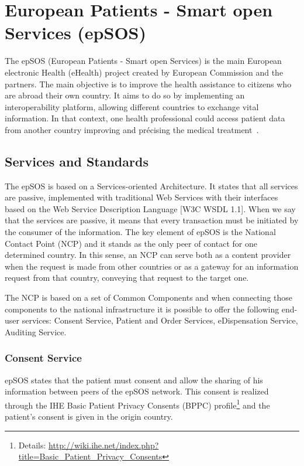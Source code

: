 \section{European Patients - Smart open Services (epSOS)} \label{sec:epsos}

The epSOS (European Patients - Smart open Services) is the main European electronic Health (eHealth) project created by European Commission and the partners. The main objective is to improve the health assistance to citizens who are abroad their own country. It aims to do so by implementing an interoperability platform, allowing different countries to exchange vital information. In that context, one health professional could access patient data from another country improving and précising the medical treatment~\citep{EpSOS}.

\subsection{Services and Standards}

The epSOS is based on a Services-oriented Architecture. It states that all services are passive, implemented with traditional Web Services with their interfaces based on the Web Service Description Language [W3C WSDL 1.1]. When we say that the services are passive, it means that every transaction must be initiated by the consumer of the information.
The key element of epSOS is the National Contact Point (NCP) and it stands as the only peer of contact for one determined country. In this sense, an NCP can serve both as a content provider when the request is made from other countries or as a gateway for an information request from that country, conveying that request to the target one.

The NCP is based on a set of Common Components and when connecting those components to the national infrastructure it is possible to offer the following end-user services: Consent Service, Patient and Order Services, eDispensation Service, Auditing Service.

\subsubsection{Consent Service}
epSOS states that the patient must consent and allow the sharing of his information between peers of the epSOS network. This consent is realized through the IHE Basic Patient Privacy Consents (BPPC) profile\footnote{Details: \url{http://wiki.ihe.net/index.php?title=Basic_Patient_Privacy_Consents}} and the patient's consent is given in the origin country.

